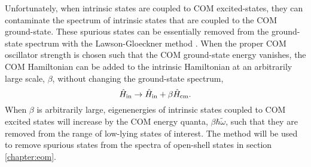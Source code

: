 \documentclass[thesis.tex]{subfiles}
\begin{document}
Unfortunately, when intrinsic states are coupled to COM excited-states, they can contaminate the spectrum of intrinsic states that are coupled to the COM ground-state.  These spurious states can be essentially removed from the ground-state spectrum with the Lawson-Gloeckner method \cite{GLOECKNER1974313}.  When the proper COM oscillator strength is chosen such that the COM ground-state energy vanishes, the COM Hamiltonian can be added to the intrinsic Hamiltonian at an arbitrarily large scale, $\beta$, without changing the ground-state spectrum,
\begin{equation} \label{eq:lawson-term}
  \hat{H}\hspace{-1pt}_{\mathrm{in}} \rightarrow \hat{H}\hspace{-1pt}_{\mathrm{in}} + \beta\hat{H}\hspace{-1pt}_{\mathrm{cm}}.
\end{equation}
When $\beta$ is arbitrarily large, eigenenergies of intrinsic states coupled to COM excited states will increase by the COM energy quanta, $\beta\hbar\widetilde{\omega}$, such that they are removed from the range of low-lying states of interest.  The method will be used to remove spurious states from the spectra of open-shell states in section \ref{chapter:eom}.
  
\end{document}
